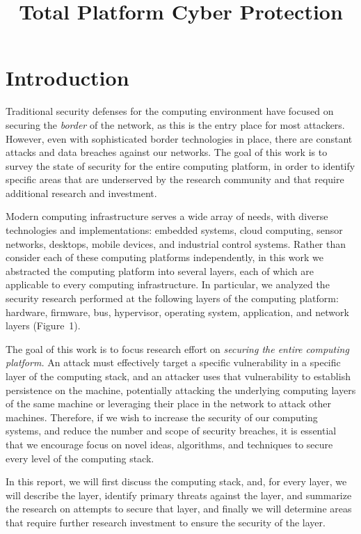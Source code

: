 \documentclass[11pt,letterpaper]{article}
\begin{document}
\title{Total Platform Cyber Protection}
\date{}

\maketitle

\section{Introduction}

Traditional security defenses for the computing environment have
focused on securing the \emph{border} of the network, as this is the
entry place for most attackers. However, even with sophisticated
border technologies in place, there are constant attacks and data
breaches against our networks. The goal of this work is to survey the
state of security for the entire computing platform, in order to
identify specific areas that are underserved by the research community
and that require additional research and investment.

Modern computing infrastructure serves a wide array of needs, with
diverse technologies and implementations: embedded systems, cloud
computing, sensor networks, desktops, mobile devices, and industrial
control systems. Rather than consider each of these computing
platforms independently, in this work we abstracted the computing
platform into several layers, each of which are applicable to every
computing infrastructure. In particular, we analyzed the security
research performed at the following layers of the computing platform:
hardware, firmware, bus, hypervisor, operating system, application,
and network layers (Figure~1).

The goal of this work is to focus research effort on \emph{securing
  the entire computing platform.} An attack must effectively target a
specific vulnerability in a specific layer of the computing stack, and
an attacker uses that vulnerability to establish persistence on the
machine, potentially attacking the underlying computing layers of the
same machine or leveraging their place in the network to attack other
machines. Therefore, if we wish to increase the security of our
computing systems, and reduce the number and scope of security
breaches, it is essential that we encourage focus on novel ideas,
algorithms, and techniques to secure every level of the computing
stack.

In this report, we will first discuss the computing stack, and, for
every layer, we will describe the layer, identify primary threats
against the layer, and summarize the research on attempts to secure
that layer, and finally we will determine areas that require further
research investment to ensure the security of the layer.
\end{document}
